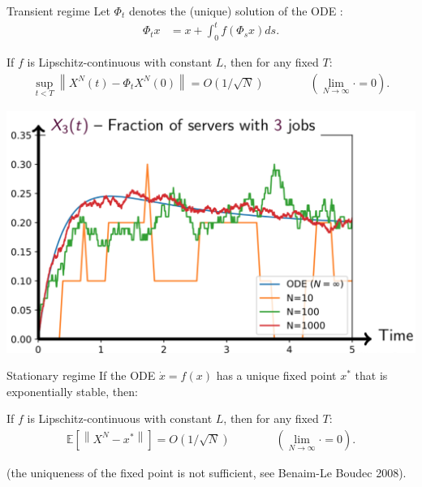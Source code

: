 \documentclass{beamer}
\newcommand\mpage[2]{%
  \begin{minipage}{#1\linewidth}%
    #2%
  \end{minipage}%
}
\newcommand\esp[1]{\mathbb{E}\left[#1\right]}
\newcommand\norm[1]{\left\|#1\right\|}
\begin{document}
\begin{frame}{Transient regime}
  Let $\Phi_t$ denotes the (unique) solution of the ODE : 
  \begin{align*}
    \Phi_tx &= x + \int_0^tf(\Phi_sx)ds.
  \end{align*}\pause 
  
  \begin{theorem}[Kurtz 70s]
    If $f$ is Lipschitz-continuous with constant $L$, then for any
    fixed $T$: 
    \begin{align*}
      \sup_{t<T}\norm{X^N(t) - \Phi_t X^N(0)} = O(1/\sqrt{N}) \qquad\qquad (\lim_{N\to\infty}\cdot=0).
    \end{align*}
  \end{theorem}

  \begin{center}
    \mpage{.5}{\includegraphics[width=\linewidth]{clt}}
  \end{center}

  
\end{frame}

\begin{frame}{Stationary regime}
  If the ODE $\dot{x}=f(x)$ has a unique fixed point $x^*$ that is
  exponentially stable, then:
  \begin{theorem}[Ying 2016]
    If $f$ is Lipschitz-continuous with constant $L$, then for any
    fixed $T$: 
    \begin{align*}
      \esp{\norm{X^N - x^*}} = O(1/\sqrt{N}) \qquad\qquad (\lim_{N\to\infty}\cdot=0).
    \end{align*}    
  \end{theorem}

  (the uniqueness of the fixed point is not sufficient, see Benaim-Le
  Boudec 2008). 
\end{frame}
\end{document}
